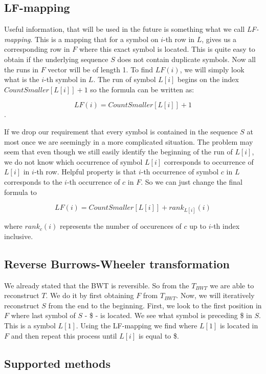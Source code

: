 \subsection{LF-mapping}

Useful information, that will be used in the future is something what we call \textit{LF-mapping}.
This is a mapping that for a symbol on $i$-th row in $L$, gives us a corresponding row in $F$
where this exact symbol is located. This is quite easy to obtain if the underlying sequence $S$
does not contain duplicate symbols. Now all the runs in $F$ vector will be of length 1.
To find $LF(i)$, we will simply look what is the $i$-th symbol in $L$. The run of
symbol $L[i]$ begins on the index $CountSmaller[L[i]] + 1$ so the formula can be written as:

$$LF(i) = CountSmaller[L[i]] + 1$$.

If we drop our requirement that every symbol is contained in the sequence $S$ at most once
we are seemingly in a more complicated situation. The problem may seem that even
though we still easily identify the beginning of the run of $L[i]$, we do not
know which occurrence of symbol $L[i]$ corresponds to occurrence of $L[i]$ in $i$-th row.
Helpful property is that $i$-th occurrence of symbol $c$ in $L$ corresponds to the
$i$-th occurrence of $c$ in $F$. So we can just change the final formula to

				$$LF(i) = CountSmaller[L[i]] + rank_{L[i]}(i)$$

where $rank_c(i)$ represents the number of occurences of $c$ up to $i$-th index inclusive.

\subsection{Reverse Burrows-Wheeler transformation}

We already stated that the BWT is reversible. So from the $T_{BWT}$ we are able to reconstruct
$T$. We do it by first obtaining $F$ from $T_{BWT}$. Now, we will iteratively reconstruct $S$
from the end to the beginning. First, we look to the first position in $F$ where last symbol
of $S$ - \$ - is located. We see what symbol is preceding \$ in $S$. This is a symbol
$L[1]$. Using the LF-mapping we find where $L[1]$ is located in $F$ and then repeat this process
until $L[i]$ is equal to \$.

\subsection{Supported methods}

